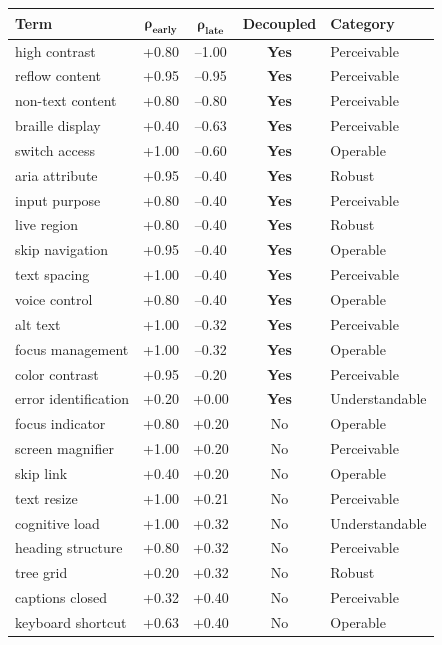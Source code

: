 \documentclass[10pt]{article} %
\begin{document}
\begin{table}[H]
\centering
\scriptsize
\begin{tabular}{|l|c|c|c|l|}
\hline
\textbf{Term} & $\mathbf{\rho_\text{early}}$ & $\mathbf{\rho_\text{late}}$ & \textbf{Decoupled} & \textbf{Category} \\
\hline
high contrast & +0.80 & --1.00 & \textbf{Yes} & Perceivable \\
reflow content & +0.95 & --0.95 & \textbf{Yes} & Perceivable \\
non-text content & +0.80 & --0.80 & \textbf{Yes} & Perceivable \\
braille display & +0.40 & --0.63 & \textbf{Yes} & Perceivable \\
switch access & +1.00 & --0.60 & \textbf{Yes} & Operable \\
aria attribute & +0.95 & --0.40 & \textbf{Yes} & Robust \\
input purpose & +0.80 & --0.40 & \textbf{Yes} & Perceivable \\
live region & +0.80 & --0.40 & \textbf{Yes} & Robust \\
skip navigation & +0.95 & --0.40 & \textbf{Yes} & Operable \\
text spacing & +1.00 & --0.40 & \textbf{Yes} & Perceivable \\
voice control & +0.80 & --0.40 & \textbf{Yes} & Operable \\
alt text & +1.00 & --0.32 & \textbf{Yes} & Perceivable \\
focus management & +1.00 & --0.32 & \textbf{Yes} & Operable \\
color contrast & +0.95 & --0.20 & \textbf{Yes} & Perceivable \\
error identification & +0.20 & +0.00 & \textbf{Yes} & Understandable \\
focus indicator & +0.80 & +0.20 & No & Operable \\
screen magnifier & +1.00 & +0.20 & No & Perceivable \\
skip link & +0.40 & +0.20 & No & Operable \\
text resize & +1.00 & +0.21 & No & Perceivable \\
cognitive load & +1.00 & +0.32 & No & Understandable \\
heading structure & +0.80 & +0.32 & No & Perceivable \\
tree grid & +0.20 & +0.32 & No & Robust \\
captions closed & +0.32 & +0.40 & No & Perceivable \\
keyboard shortcut & +0.63 & +0.40 & No & Operable \\

\end{tabular}
\end{table}
\end{document}
